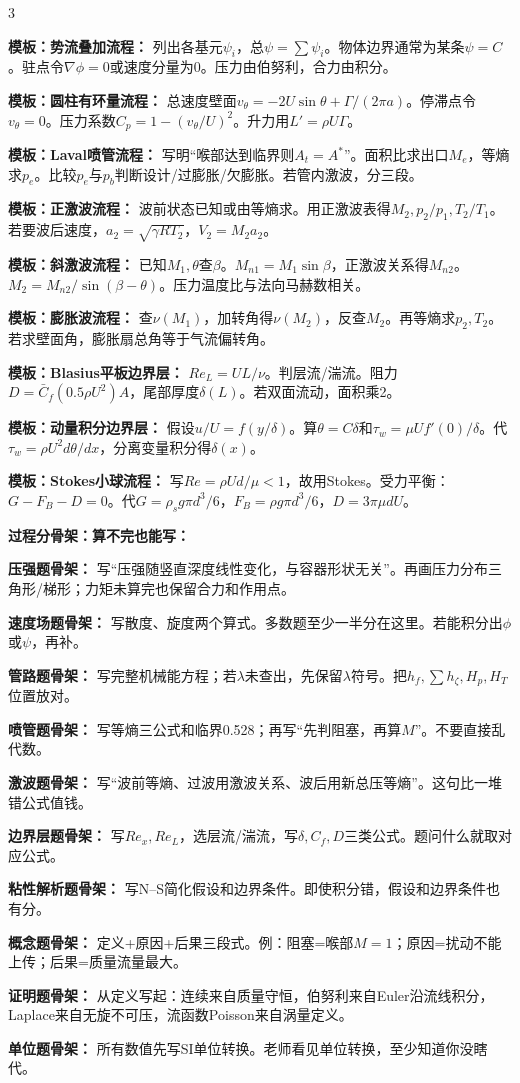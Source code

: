 \documentclass[a4paper]{article}
\newcommand{\sect}[1]{\par{\bfseries\color{Q}#1：}}
\begin{document}
\begin{multicols}{3}
{\sect{模板：势流叠加流程}
列出各基元$\psi_i$，总$\psi=\sum\psi_i$。物体边界通常为某条$\psi=C$。驻点令$\nabla\phi=0$或速度分量为0。压力由伯努利，合力由积分。
\sect{模板：圆柱有环量流程}
总速度壁面$v_\theta=-2U\sin\theta+\Gamma/(2\pi a)$。停滞点令$v_\theta=0$。压力系数$C_p=1-(v_\theta/U)^2$。升力用$L'=\rho U\Gamma$。
\sect{模板：Laval喷管流程}
写明“喉部达到临界则$A_t=A^*$”。面积比求出口$M_e$，等熵求$p_e$。比较$p_e$与$p_b$判断设计/过膨胀/欠膨胀。若管内激波，分三段。
\sect{模板：正激波流程}
波前状态已知或由等熵求。用正激波表得$M_2,p_2/p_1,T_2/T_1$。若要波后速度，$a_2=\sqrt{\gamma RT_2}$，$V_2=M_2a_2$。
\sect{模板：斜激波流程}
已知$M_1,\theta$查$\beta$。$M_{n1}=M_1\sin\beta$，正激波关系得$M_{n2}$。$M_2=M_{n2}/\sin(\beta-\theta)$。压力温度比与法向马赫数相关。
\sect{模板：膨胀波流程}
查$\nu(M_1)$，加转角得$\nu(M_2)$，反查$M_2$。再等熵求$p_2,T_2$。若求壁面角，膨胀扇总角等于气流偏转角。
\sect{模板：Blasius平板边界层}
$Re_L=UL/\nu$。判层流/湍流。阻力$D=\bar C_f(0.5\rho U^2)A$，尾部厚度$\delta(L)$。若双面流动，面积乘2。
\sect{模板：动量积分边界层}
假设$u/U=f(y/\delta)$。算$\theta=C\delta$和$\tau_w=\mu U f'(0)/\delta$。代$\tau_w=\rho U^2 d\theta/dx$，分离变量积分得$\delta(x)$。
\sect{模板：Stokes小球流程}
写$Re=\rho Ud/\mu<1$，故用Stokes。受力平衡：$G-F_B-D=0$。代$G=\rho_sg\pi d^3/6$，$F_B=\rho g\pi d^3/6$，$D=3\pi\mu dU$。

\sect{过程分骨架：算不完也能写}
\sect{压强题骨架}
写“压强随竖直深度线性变化，与容器形状无关”。再画压力分布三角形/梯形；力矩未算完也保留合力和作用点。
\sect{速度场题骨架}
写散度、旋度两个算式。多数题至少一半分在这里。若能积分出$\phi$或$\psi$，再补。
\sect{管路题骨架}
写完整机械能方程；若$\lambda$未查出，先保留$\lambda$符号。把$h_f,\sum h_\zeta,H_p,H_T$位置放对。
\sect{喷管题骨架}
写等熵三公式和临界0.528；再写“先判阻塞，再算$M$”。不要直接乱代数。
\sect{激波题骨架}
写“波前等熵、过波用激波关系、波后用新总压等熵”。这句比一堆错公式值钱。
\sect{边界层题骨架}
写$Re_x,Re_L$，选层流/湍流，写$\delta,C_f,D$三类公式。题问什么就取对应公式。
\sect{粘性解析题骨架}
写N--S简化假设和边界条件。即使积分错，假设和边界条件也有分。
\sect{概念题骨架}
定义+原因+后果三段式。例：阻塞=喉部$M=1$；原因=扰动不能上传；后果=质量流量最大。
\sect{证明题骨架}
从定义写起：连续来自质量守恒，伯努利来自Euler沿流线积分，Laplace来自无旋不可压，流函数Poisson来自涡量定义。
\sect{单位题骨架}
所有数值先写SI单位转换。老师看见单位转换，至少知道你没瞎代。

}
\end{multicols}
\end{document}
